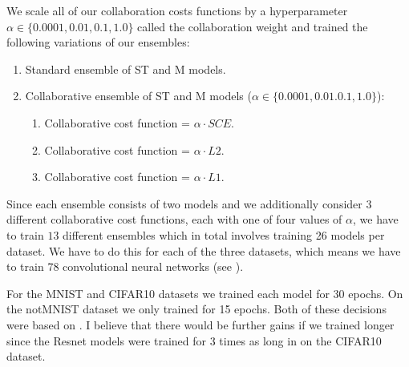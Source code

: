 \documentclass[english,a4paper,oneside]{amsart}
\theoremstyle{definition}
\begin{document}
We scale all of our collaboration costs functions by a hyperparameter $\alpha \in \{0.0001, 0.01, 0.1, 1.0\}$ called the collaboration weight and trained the following variations of our ensembles:
\begin{enumerate}
	\item Standard ensemble of ST and M models.
	\item Collaborative ensemble of ST and M models ($\alpha \in \{0.0001, 0.01. 0.1, 1.0\}$):
	\begin{enumerate}
		\item Collaborative cost function = $\alpha \cdot SCE$.
		\item Collaborative cost function = $\alpha \cdot L2$.
		\item Collaborative cost function = $\alpha \cdot  L1$.
	\end{enumerate}
\end{enumerate}

Since each ensemble consists of two models and we additionally consider 3 different collaborative cost functions, each with one of four values of $\alpha$, we have to train $13$ different ensembles which in total involves training 26 models per dataset. We have to do this for each of the three datasets, which means we have to train 78 convolutional neural networks (see ).

For the MNIST and CIFAR10 datasets we trained each model for 30 epochs. On the notMNIST dataset we only trained for 15 epochs. Both of these decisions were based on . I believe that there would be further gains if we trained longer since the Resnet models were trained for 3 times as long in \cite{ResNet} on the CIFAR10 dataset.



\end{document}
